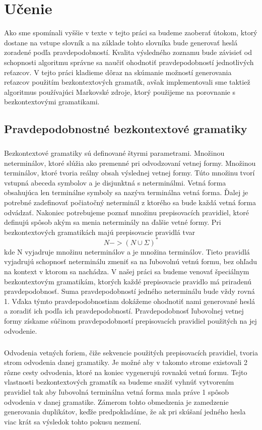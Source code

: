 \chapter{Učenie}
Ako sme spomínali vyššie v texte v tejto práci sa budeme zaoberať útokom, ktorý dostane na vstupe slovník a na základe tohto slovníka bude generovať heslá zoradené podľa pravdepodobností. Kvalita výsledného zoznamu bude závisieť od schopnosti algoritmu správne sa naučiť ohodnotiť pravdepodobností jednotlivých reťazcov. V tejto práci kladieme dôraz na skúmanie možností generovania reťazcov použitím bezkontextových gramatík, avšak implementovali sme taktiež algoritmus používajúci Markovské zdroje, ktorý použijeme na porovnanie s bezkontextovými gramatikami.

\section{Pravdepodobnostné bezkontextové gramatiky}
\paragraph{}
Bezkontextové gramatiky sú definované štyrmi parametrami. Množinou neterminálov, ktoré slúžia ako premenné pri odvodzovaní vetnej formy. Množinou terminálov, ktoré tvoria reálny obsah výslednej vetnej formy. Túto množinu tvorí vstupná abeceda symbolov a je disjunktná s neterminálmi. Vetná forma obsahujúca len terminálne symboly sa nazýva terminálna vetná forma. Ďalej je potrebné zadefinovať počiatočný neterminál z ktorého sa bude každá vetná forma odvádzať. Nakoniec potrebujeme poznať množinu prepisovacích pravidiel, ktoré definujú spôsob akým sa menia neterminály na ďalšie vetné formy. Pri bezkontextových gramatikách majú prepisovacie pravidlá tvar
\[N -> (N \cup \Sigma)^*\]
kde N vyjadruje množinu neterminálov a \textSigma je množina terminálov. Tieto pravidlá vyjadrujú schopnosť neterminálu zmeniť sa na ľubovolnú vetnú formu, bez ohľadu na kontext v ktorom sa nachádza. V našej práci sa budeme venovať špeciálnym bezkontextovým gramatikám, ktorých každé prepisovacie pravidlo má priradenú pravdepodobnosť. Suma pravdepodobností jedného neterminálu bude vždy rovná 1. Vďaka týmto pravdepodobnostiam dokážeme ohodnotiť nami generované heslá a zoradiť ich podľa ich pravdepodobností. Pravdepodobnosť ľubovolnej vetnej formy získame súčinom pravdepodobností prepisovacích pravidiel použitých na jej odvodenie.

\paragraph{}
Odvodenia vetných foriem, čiže sekvencie použitých prepisovacích pravidiel, tvoria strom odvodenia danej gramatiky. Je možné aby v takomto strome existovali 2 rôzne cesty odvodenia, ktoré na koniec vygenerujú rovnakú vetnú formu. Tejto vlastnosti bezkontextových gramatík sa budeme snažiť vyhnúť vytvorením pravidiel tak aby ľubovolná terminálna vetná forma mala práve 1 spôsob odvodenia v danej gramatike. Zámerom tohto obmedzenia je zamedzenie generovania duplikátov, keďže predpokladáme, že ak pri skúšaní jedného hesla viac krát sa výsledok tohto pokusu nezmení.


